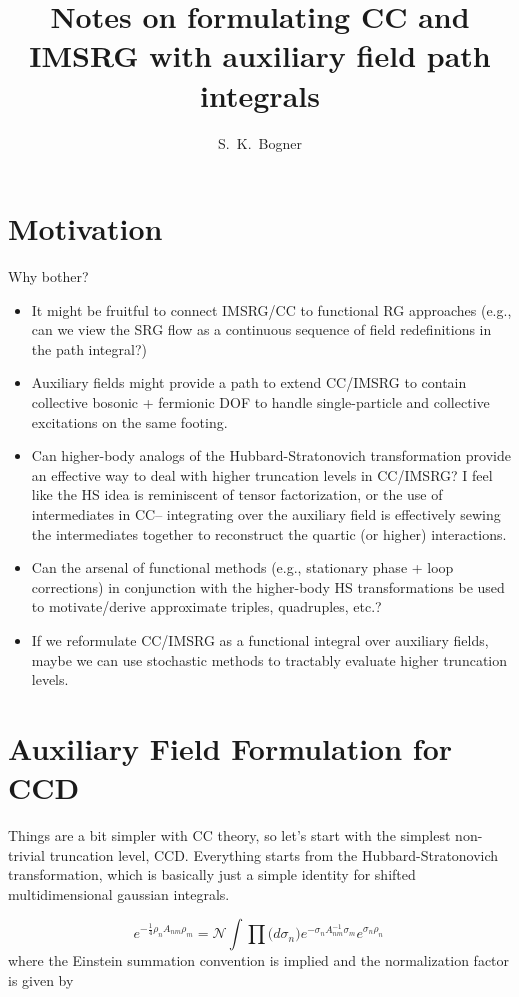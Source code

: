 \documentclass[12pt]{article}
\title{Notes on formulating CC and IMSRG with auxiliary field path integrals}
\author{S.~K.~Bogner}
\begin{document}
\maketitle
\section{Motivation}
Why bother?
\begin{itemize}
\item It might be fruitful to connect IMSRG/CC to functional RG approaches (e.g., can we view the SRG flow as a continuous sequence of field redefinitions in the path integral?)
\item Auxiliary fields might provide a path to extend CC/IMSRG to contain collective bosonic + fermionic DOF to handle single-particle and collective excitations on the same footing.
\item Can higher-body analogs of the Hubbard-Stratonovich transformation provide an effective way to deal with higher truncation levels in CC/IMSRG? I feel like the HS idea is reminiscent of tensor factorization, or the use of intermediates in CC-- integrating over the auxiliary field is effectively sewing the intermediates together to reconstruct the quartic (or higher) interactions. 
\item Can the arsenal of functional methods (e.g., stationary phase + loop corrections) in conjunction with the higher-body HS transformations be used to motivate/derive approximate triples, quadruples, etc.?
\item If we reformulate CC/IMSRG as a functional integral over auxiliary fields, maybe we can use stochastic methods to tractably evaluate higher truncation levels. 
\end{itemize}  


\section{Auxiliary Field  Formulation for CCD }
Things are a bit simpler with CC theory, so let's start with the simplest non-trivial truncation level, CCD. Everything starts from the Hubbard-Stratonovich transformation, which is basically just a simple identity for shifted multidimensional gaussian integrals. 

\begin{equation}
\label{eq:HS}
e^{-\frac{1}{4}\rho_n A_{nm}\rho_m} = \mathcal{N}\int \prod\bigl(d\sigma_n\bigr) e^{-\sigma_n A^{-1}_{nm}\sigma_m} e^{\sigma_n\rho_n}\,
\end{equation}
where the Einstein summation convention is implied and the normalization factor is given by 
\end{document}
